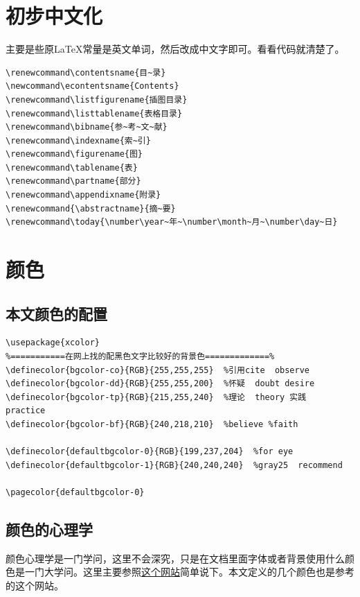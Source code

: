 \documentclass[11pt,oneside]{book}
\begin{document}
\begin{common-format}
\section{初步中文化}
主要是些原\LaTeX 常量是英文单词，然后改成中文字即可。看看代码就清楚了。
\begin{Verbatim}
\renewcommand\contentsname{目~录}
\newcommand\econtentsname{Contents}
\renewcommand\listfigurename{插图目录}
\renewcommand\listtablename{表格目录}
\renewcommand\bibname{参~考~文~献}
\renewcommand\indexname{索~引}
\renewcommand\figurename{图}
\renewcommand\tablename{表}
\renewcommand\partname{部分}
\renewcommand\appendixname{附录}
\renewcommand{\abstractname}{摘~要}
\renewcommand\today{\number\year~年~\number\month~月~\number\day~日}
\end{Verbatim}


\section{颜色}
\label{sec:颜色}

\subsection{本文颜色的配置}
\begin{Verbatim}
\usepackage{xcolor}  
%===========在网上找的配黑色文字比较好的背景色=============%
\definecolor{bgcolor-co}{RGB}{255,255,255}  %引用cite  observe
\definecolor{bgcolor-dd}{RGB}{255,255,200}  %怀疑  doubt desire 
\definecolor{bgcolor-tp}{RGB}{215,255,240}  %理论  theory 实践  practice
\definecolor{bgcolor-bf}{RGB}{240,218,210}  %believe %faith

\definecolor{defaultbgcolor-0}{RGB}{199,237,204}  %for eye
\definecolor{defaultbgcolor-1}{RGB}{240,240,240}  %gray25  recommend

\pagecolor{defaultbgcolor-0}
\end{Verbatim}

\subsection{颜色的心理学}
颜色心理学是一门学问，这里不会深究，只是在文档里面字体或者背景使用什么颜色是一门大学问。这里主要参照\href{http://www.jb51.net/article/8216.htm}{这个网站}简单说下。本文定义的几个颜色也是参考的这个网站。


\end{common-format}
\end{document}
